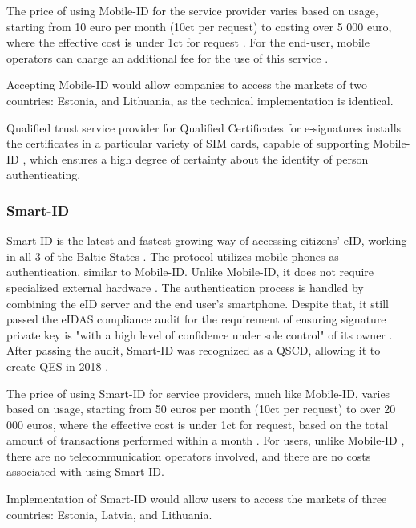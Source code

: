 The price of using Mobile-ID for the service provider varies based on usage, starting from 10 euro per month (10ct per request) to costing over 5 000 euro, where the effective cost is under 1ct for request \cite{sk-mobileidpricing}. For the end-user, mobile operators can charge an additional fee for the use of this service \cite{telia-mobileid}.

Accepting Mobile-ID would allow companies to access the markets of two countries: Estonia, and Lithuania, as the technical implementation is identical.

Qualified trust service provider for Qualified Certificates for e-signatures installs the certificates in a particular variety of SIM cards, capable of supporting Mobile-ID \cite{eu-trustservices}, which ensures a high degree of certainty about the identity of person authenticating.


\subsubsection{Smart-ID}

Smart-ID is the latest and fastest-growing way of accessing citizens' eID, working in all 3 of the Baltic States \cite{sk-history2017}. The protocol utilizes mobile phones as authentication, similar to Mobile-ID. Unlike Mobile-ID, it does not require specialized external hardware \cite{smartid-docs}. The authentication process is handled by combining the eID server and the end user's smartphone. Despite that, it still passed the eIDAS compliance audit for the requirement of ensuring signature private key is "with a high level of confidence under sole control" of its owner \cite{enisa-eidasreq}. After passing the audit, Smart-ID was recognized as a QSCD, allowing it to create QES in 2018 \cite{smartid-qscd}.

The price of using Smart-ID for service providers, much like Mobile-ID, varies based on usage, starting from 50 euros per month (10ct per request) to over 20 000 euros, where the effective cost is under 1ct for request, based on the total amount of transactions performed within a month \cite{sk-smartidpricing}. For users, unlike Mobile-ID \cite{telia-mobileid}, there are no telecommunication operators involved, and there are no costs associated with using Smart-ID.

Implementation of Smart-ID would allow users to access the markets of three countries: Estonia, Latvia, and Lithuania.

